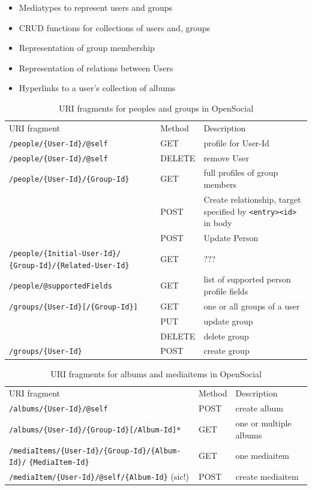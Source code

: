 \documentclass[12pt,a4paper,twoside]{scrartcl}		%
\begin{document}
\begin{itemize}
\item Mediatypes to represent users and groups
\item CRUD functions for collections of users and, groups
\item Representation of group membership
\item Representation of relations between Users
\item Hyperlinks to a user's collection of albums
\end{itemize}


\begin{table}[tbh]
\begin{tabular}{p{6.5cm} l p{10cm}}
  URI fragment & Method & Description \\
  \verb:/people/{User-Id}/@self: & GET & profile for User-Id \\
  \verb:/people/{User-Id}/@self: & DELETE & remove User \\
  \verb:/people/{User-Id}/{Group-Id}: & GET & full profiles of group members \\
  \verb:: & POST & Create relationship, target specified \newline by \verb:<entry><id>: in body \\
   & POST & Update Person \\
  \verb:/people/{Initial-User-Id}/: \newline \verb:{Group-Id}/{Related-User-Id}: & GET & ??? \\
  \verb:/people/@supportedFields: & GET & list of supported person profile fields \\
  \verb:/groups/{User-Id}[/{Group-Id}]: & GET & one or all groups of a user \\
   & PUT & update group \\
   & DELETE & delete group \\
  \verb:/groups/{User-Id}: & POST & create group \\
\end{tabular}
  \caption{URI fragments for peoples and groups in OpenSocial}
  \label{tab:OSURIPersons}
\end{table}

\begin{table}[tbh]
\begin{tabular}{p{9.5cm} l p{8cm}}
  URI fragment & Method & Description \\
  \verb:/albums/{User-Id}/@self: & POST & create album \\
  \verb:/albums/{User-Id}/{Group-Id}[/Album-Id]*: & GET & one or multiple albums \\
  \verb:/mediaItems/{User-Id}/{Group-Id}/{Album-Id}/: \newline \verb:{MediaItem-Id}: & GET & one mediaitem \\
  \verb:/mediaItem/{User-Id}/@self/{Album-Id}: (sic!) & POST & create mediaitem \\
\end{tabular}
  \caption{URI fragments for albums and mediaitems in OpenSocial}
  \label{tab:OSURIAlbums}
\end{table}
\end{document}

